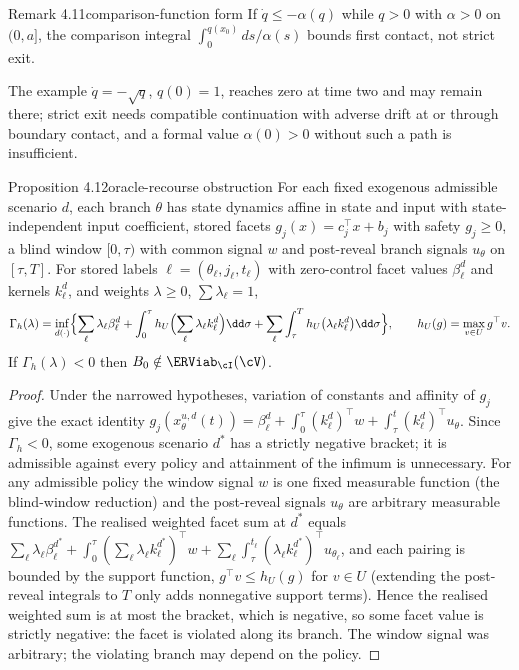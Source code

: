 \begin{restated}{Remark 4.11}{comparison-function form}
If $\dot q\le-\alpha(q)$ while $q>0$ with $\alpha>0$ on $(0,a]$, the comparison integral $\int_0^{q(x_0)}ds/\alpha(s)$ bounds first contact, not strict exit.
\end{restated}

The example $\dot q=-\sqrt q$, $q(0)=1$, reaches zero at time two and may remain there; strict exit needs compatible continuation with adverse drift at or through boundary contact, and a formal value $\alpha(0)>0$ without such a path is insufficient.

\begin{restated}{Proposition 4.12}{oracle-recourse obstruction}
For each fixed exogenous admissible scenario $d$, each branch $\theta$ has state dynamics affine in state and input with state-independent input coefficient, stored facets $g_j(x)=c_j^\top x+b_j$ with safety $g_j\ge0$, a blind window $[0,\tau)$ with common signal $w$ and post-reveal branch signals $u_\theta$ on $[\tau,T]$. For stored labels $\ell=(\theta_\ell,j_\ell,t_\ell)$ with zero-control facet values $\beta^d_\ell$ and kernels $k^d_\ell$, and weights $\lambda\ge0$, $\sum\lambda_\ell=1$,
\[
\Gamma_h(\lambda)=\inf_{d(\cdot)}\Bigl\{\sum_\ell\lambda_\ell\beta^d_\ell+\int_0^\tau h_U\Bigl(\sum_\ell\lambda_\ell k^d_\ell\Bigr)\dd\sigma+\sum_\ell\int_\tau^{T}h_U\bigl(\lambda_\ell k^d_\ell\bigr)\dd\sigma\Bigr\},\qquad h_U(g)=\max_{v\in U}g^\top v .
\]
If $\Gamma_h(\lambda)<0$ then $B_0\notin\ERViab_\cI(\cV)$.
\end{restated}

\begin{proof}
Under the narrowed hypotheses, variation of constants and affinity of $g_j$ give the exact identity $g_j(x^{u,d}_\theta(t))=\beta^d_\ell+\int_0^\tau(k^d_\ell)^\top w+\int_\tau^t(k^d_\ell)^\top u_\theta$. Since $\Gamma_h<0$, some exogenous scenario $d^*$ has a strictly negative bracket; it is admissible against every policy and attainment of the infimum is unnecessary. For any admissible policy the window signal $w$ is one fixed measurable function (the blind-window reduction) and the post-reveal signals $u_{\theta}$ are arbitrary measurable functions. The realised weighted facet sum at $d^*$ equals $\sum_\ell\lambda_\ell\beta^{d^*}_\ell+\int_0^\tau(\sum_\ell\lambda_\ell k^{d^*}_\ell)^\top w+\sum_\ell\int_\tau^{t_\ell}(\lambda_\ell k^{d^*}_\ell)^\top u_{\theta_\ell}$, and each pairing is bounded by the support function, $g^\top v\le h_U(g)$ for $v\in U$ (extending the post-reveal integrals to $T$ only adds nonnegative support terms). Hence the realised weighted sum is at most the bracket, which is negative, so some facet value is strictly negative: the facet is violated along its branch. The window signal was arbitrary; the violating branch may depend on the policy.
\end{proof}

